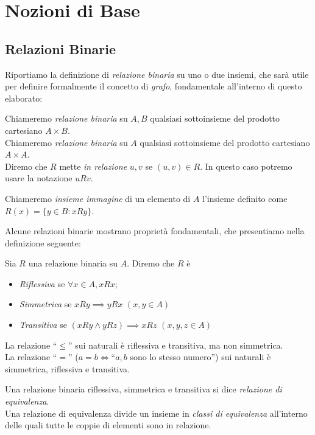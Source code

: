 \section{Nozioni di Base}
\label{sec:base}

\subsection{Relazioni Binarie}
Riportiamo la definizione di \emph{relazione binaria} su uno o due insiemi, che sarà utile per definire formalmente il concetto di \emph{grafo}, fondamentale all'interno di questo elaborato:
\begin{definition}
    Chiameremo \emph{relazione binaria} su $A,B$ qualsiasi sottoinsieme del prodotto cartesiano $A \times B$.\\
    Chiameremo \emph{relazione binaria} su $A$ qualsiasi sottoinsieme del prodotto cartesiano $A \times A$.\\
	Diremo che $R$ mette \emph{in relazione} $u,v$ se $(u,v) \in R$. In questo caso potremo usare la notazione $u R v$.
\end{definition}
\begin{definition}
    Chiameremo \emph{insieme immagine} di un elemento di $A$ l'insieme definito come $R(x) = \{y \in B : x R y\}$.
\end{definition}
Alcune relazioni binarie mostrano proprietà fondamentali, che presentiamo nella definizione seguente:
\begin{definition}
    Sia $R$ una relazione binaria su $A$. Diremo che $R$ è
    \begin{itemize}
        \item \emph{Riflessiva} se $\forall x \in A, x R x$;
        \item \emph{Simmetrica} se $x R y \implies y R x \,\,(x,y \in A)$
        \item \emph{Transitiva} se $(x R y \land y R z) \implies x R z \,\,(x,y,z \in A)$
    \end{itemize}
\end{definition}
\begin{example}
    La relazione ``$\leq$'' sui naturali è riflessiva e transitiva, ma non simmetrica.\\
    La relazione ``$=$'' ($a = b \iff $``$a,b$ sono lo stesso numero'') sui naturali è simmetrica, riflessiva e transitiva.
\end{example}
\begin{definition}
    Una relazione binaria riflessiva, simmetrica e transitiva si dice \emph{relazione di equivalenza}.\\
    Una relazione di equivalenza divide un insieme in \emph{classi di equivalenza} all'interno delle quali tutte le coppie di elementi sono in relazione.
\end{definition}
